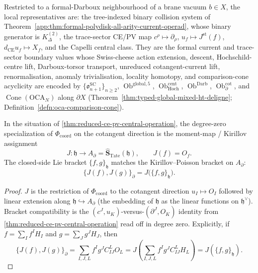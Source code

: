 \documentclass[11pt]{memoir}
\begin{document}
\begin{rmk}
  Restricted to a formal-Darboux neighbourhood of a brane vacuum
  \(b\in X\), the local representatives are:
  the tree-indexed binary collision system of
  Theorem~\ref{app:thm:formal-polydisk-all-arity-current-operad}, whose
  binary generator is \(K^{(2)}_\Delta\), the trace-sector CE/PV map
  \(c^\rho\mapsto\partial_\rho\),
  \(u_f\mapsto J^{\mathrm{st}}(f)\),
  \(d_{\mathrm{CE}}u_f\mapsto X_f\), and the Capelli central
  class.  They are the formal current and trace-sector boundary
  values whose Swiss-cheese action extension, descent,
  Hochschild-centre lift, Darboux-torsor transport, unreduced
  cotangent-current lift, renormalisation, anomaly trivialisation,
  locality homotopy, and comparison-cone acyclicity are encoded by
	  \(\{\mathfrak o^{\mathrm{SC}}_{n+1}\}_{n\ge2}\),
	  \(\operatorname{Ob}^{\mathrm{global},5}\),
	  \(\operatorname{Ob}^{\mathrm{cent}}_{\mathrm{Hoch}}\),
	  \(\operatorname{Ob}^{\mathrm{Darb}}\),
	  \(\operatorname{Ob}^{\mathrm{cot}}_\partial\), and
	  \(\operatorname{Cone}(\mathrm{OCA}_N)\) along \(\partial X\)
	  (Theorem~\ref{thm:typed-global-mixed-ht-deligne};
	  Definition~\ref{defn:oca-comparison-cone}).
\end{rmk}



\begin{cor}\label{cor:moment-map-shadow}
  In the situation of \ref{thm:reduced-ce-pv-central-operation}, the
  degree-zero specialization of \(\Phi_{\mathrm{coord}}\) on the
  cotangent direction is the moment-map / Kirillov assignment
  $$J:\mathfrak h\longrightarrow A_\partial=
    \widehat{\mathbf S}_{\mathrm{Tate}}(\mathfrak h),
    \qquad J(f)=O_f.$$
  The closed-side Lie bracket $\{f,g\}_{\mathfrak h}$ matches the
  Kirillov--Poisson bracket on $A_\partial$:
  $$\{J(f),J(g)\}_\partial=J\bigl(\{f,g\}_{\mathfrak h}\bigr).$$
\end{cor}

\begin{proof}
  $J$ is the restriction of \(\Phi_{\mathrm{coord}}\) to the cotangent direction
  $u_I\mapsto O_I$ followed by linear extension along
  $\mathfrak h\hookrightarrow A_\partial$ (the embedding of
  $\mathfrak h$ as the linear functions on $\mathfrak h^\vee$). Bracket
  compatibility is the $(c^J,u_K)$-versus-$(\partial^J,O_K)$ identity
  from \ref{thm:reduced-ce-pv-central-operation} read off in degree zero.
  Explicitly, if \(f=\sum_I f^I H_I\) and
  \(g=\sum_J g^JH_J\), then
  \[
    \{J(f),J(g)\}_{\partial}
    =
    \sum_{I,J,L} f^Ig^JC^L_{IJ}O_L
    =
    J\!\left(\sum_{I,J,L}f^Ig^JC^L_{IJ}H_L\right)
    =
    J(\{f,g\}_{\mathfrak h}).
  \]
\end{proof}
\end{document}
